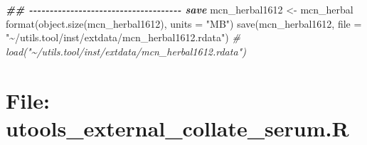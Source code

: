 \documentclass[
]{article}
\newenvironment{Shaded}{\begin{snugshade}}{\end{snugshade}}
\newcommand{\AttributeTok}[1]{\textcolor[rgb]{0.77,0.63,0.00}{#1}}
\newcommand{\CommentTok}[1]{\textcolor[rgb]{0.56,0.35,0.01}{\textit{#1}}}
\newcommand{\DocumentationTok}[1]{\textcolor[rgb]{0.56,0.35,0.01}{\textbf{\textit{#1}}}}
\newcommand{\FunctionTok}[1]{\textcolor[rgb]{0.00,0.00,0.00}{#1}}
\newcommand{\NormalTok}[1]{#1}
\newcommand{\OtherTok}[1]{\textcolor[rgb]{0.56,0.35,0.01}{#1}}
\newcommand{\StringTok}[1]{\textcolor[rgb]{0.31,0.60,0.02}{#1}}
\begin{document}
\begin{Shaded}
\begin{Highlighting}[]
\DocumentationTok{\#\# {-}{-}{-}{-}{-}{-}{-}{-}{-}{-}{-}{-}{-}{-}{-}{-}{-}{-}{-}{-}{-}{-}{-}{-}{-}{-}{-}{-}{-}{-}{-}{-}{-}{-}{-}{-}{-} save}
\NormalTok{mcn\_herbal1612 }\OtherTok{\textless{}{-}}\NormalTok{ mcn\_herbal}
\FunctionTok{format}\NormalTok{(}\FunctionTok{object.size}\NormalTok{(mcn\_herbal1612), }\AttributeTok{units =} \StringTok{"MB"}\NormalTok{)}
\FunctionTok{save}\NormalTok{(mcn\_herbal1612, }\AttributeTok{file =} \StringTok{"\textasciitilde{}/utils.tool/inst/extdata/mcn\_herbal1612.rdata"}\NormalTok{)}
\CommentTok{\# load("\textasciitilde{}/utils.tool/inst/extdata/mcn\_herbal1612.rdata")}
\end{Highlighting}
\end{Shaded}

\hypertarget{file-utools_external_collate_serum.r}{%
\section{File: utools\_external\_collate\_serum.R}\label{file-utools_external_collate_serum.r}}
\end{document}
